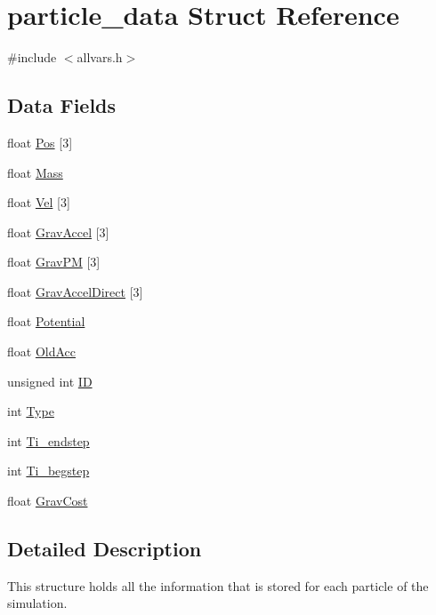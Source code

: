 \hypertarget{structparticle__data}{
\section{particle\_\-data Struct Reference}
\label{structparticle__data}
}


{\ttfamily \#include $<$allvars.h$>$}

\subsection*{Data Fields}
\begin{DoxyCompactItemize}
\item 
float \hyperlink{structparticle__data_a764ffe35d82a64065f585e3a84263dd1}{Pos} \mbox{[}3\mbox{]}
\item 
float \hyperlink{structparticle__data_a710e551be01f4ef85442d0928aca728c}{Mass}
\item 
float \hyperlink{structparticle__data_ad7808af1e23fbd920d7eb477bc68bd00}{Vel} \mbox{[}3\mbox{]}
\item 
float \hyperlink{structparticle__data_a601ab390c85cd05a5c965e3353d403f3}{GravAccel} \mbox{[}3\mbox{]}
\item 
float \hyperlink{structparticle__data_a66cad4fae4501e68c9be5f6c643a8798}{GravPM} \mbox{[}3\mbox{]}
\item 
float \hyperlink{structparticle__data_ae4d6efa44515e66a9b7806d8d57a88bf}{GravAccelDirect} \mbox{[}3\mbox{]}
\item 
float \hyperlink{structparticle__data_a9d45a0cefc6121831905e169072550d0}{Potential}
\item 
float \hyperlink{structparticle__data_a5466aae28c06365368c9399c8f7cc02d}{OldAcc}
\item 
unsigned int \hyperlink{structparticle__data_aefa92af245e44af30d28799ab1419e74}{ID}
\item 
int \hyperlink{structparticle__data_ab6119b261ff95e8f84ae171139704cbd}{Type}
\item 
int \hyperlink{structparticle__data_a9bf2c52c7378a961222d9fe8faa9c208}{Ti\_\-endstep}
\item 
int \hyperlink{structparticle__data_a6c9f057d234839cecaaeffc87b7a9794}{Ti\_\-begstep}
\item 
float \hyperlink{structparticle__data_a2f34828ae7803611a4e86bb201697317}{GravCost}
\end{DoxyCompactItemize}


\subsection{Detailed Description}
This structure holds all the information that is stored for each particle of the simulation. 

